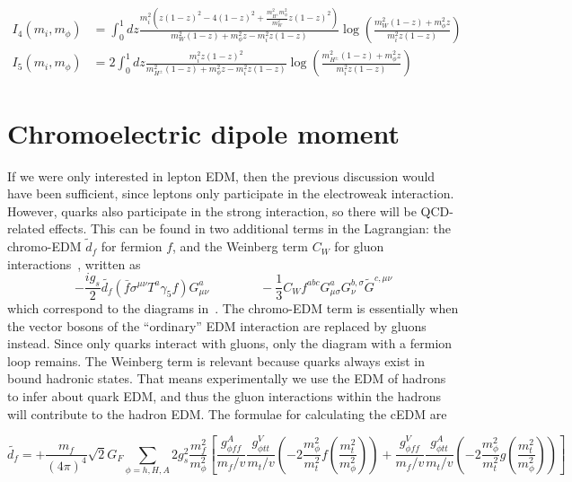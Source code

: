 \begin{adjustwidth}{-2.5cm}{-2.5cm}
	\begin{align}
	I_{4}(m_{i}, m_{\phi}) &= \int_0^1 d z \frac{m_i^2\left(z(1-z)^2-4(1-z)^2+\frac{m_{H^{\pm}}^{2}m_\phi^2}{m_W^2} z(1-z)^2\right)}{m_W^2(1-z)+m_\phi^2 z-m_i^2 z(1-z)} \log \left(\frac{m_W^2(1-z)+m_\phi^2 z}{m_i^2 z(1-z)}\right)\\
	I_{5}(m_{i}, m_{\phi}) &= 2 \int_0^1 d z \frac{m_i^2 z(1-z)^2}{m_{H^{\pm}}^2(1-z)+m_\phi^2 z-m_i^2 z(1-z)} \log \left(\frac{m_{H^{\pm}}^2(1-z)+m_\phi^2 z}{m_i^2 z(1-z)}\right)
	\end{align}
\end{adjustwidth}

\section{Chromoelectric dipole moment}
If we were only interested in lepton EDM, then the previous discussion would have been sufficient, since leptons only participate in the electroweak interaction.
However, quarks also participate in the strong interaction, so there will be QCD-related effects.
This can be found in two additional terms in the Lagrangian: 
the chromo-EDM \(\tilde{d}_{f} \) for fermion \(f \), and the Weinberg term \(C_{W} \) for gluon interactions~\cite{Weinberg1989Gluon}, written as
\begin{equation}
  -\frac{i g_{s}}{2}\tilde{d_{f}}\left(\bar{f}\sigma^{\mu\nu}T^{a}\gamma_{5}f\right)G^{a}_{\mu\nu}\quad \qquad \quad -\frac{1}{3}C_Wf^{abc}G^{a}_{\mu\sigma}G^{b,\sigma}_{\nu}\tilde{G}^{c,\mu\nu}
\end{equation}
which correspond to the diagrams in~.
The chromo-EDM term is essentially when the vector bosons of the ``ordinary'' EDM interaction are replaced by gluons instead.
Since only quarks interact with gluons, only the diagram with a fermion loop remains.
The Weinberg term is relevant because quarks always exist in bound hadronic states.
That means experimentally we use the EDM of hadrons to infer about quark EDM, and thus the gluon interactions within the hadrons will contribute to the hadron EDM.
The formulae for calculating the cEDM are

\begin{adjustwidth}{-1.5cm}{-1.5cm}
	\begin{equation}
	\tilde{d_{f}} = +\frac{m_{f}}{(4\pi)^{4}}\sqrt{2}G_{F}\sum_{\phi=h,H,A}2g_{s}^{2}\frac{m_{f}^{2}}{m_{\phi}^{2}}
	\left[\frac{g_{\phi ff}^{A}}{m_{f}/v}\frac{g_{\phi tt}^{V}}{m_{t}/v}\left(-2\frac{m_{\phi}^{2}}{m_{t}^{2}} f\left(\frac{m_{t}^{2}}{m_{\phi}^{2}}\right)\right) 
	+ \frac{g_{\phi ff}^{V}}{m_{f}/v}\frac{g_{\phi tt}^{A}}{m_{t}/v}\left(-2\frac{m_{\phi}^{2}}{m_{t}^{2}} g\left(\frac{m_{t}^{2}}{m_{\phi}^{2}}\right)\right)\right]
	\end{equation}
\end{adjustwidth}

